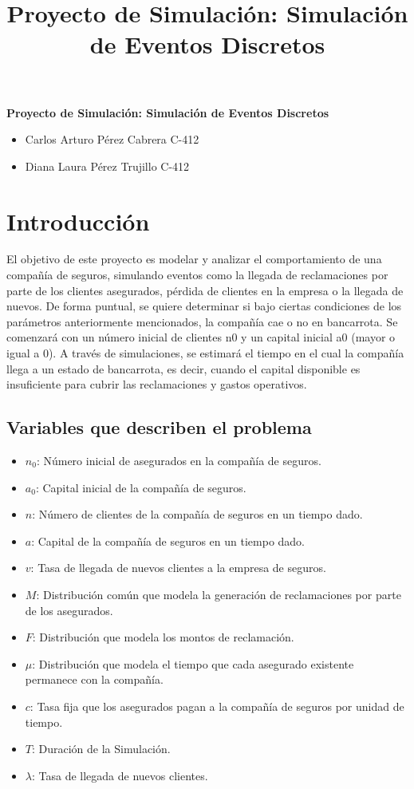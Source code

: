 \documentclass{article}
\title{Proyecto de Simulación: Simulación de Eventos Discretos}
\begin{document}
\begin{titlepage}
    \centering
{\bfseries\Huge Proyecto de Simulación: Simulación de Eventos Discretos \par}
\vspace{2cm}
\begin{itemize}
    \item {\large Carlos Arturo Pérez Cabrera C-412}
    \item {\large Diana Laura Pérez Trujillo C-412}
\end{itemize}

\end{titlepage}

\section{Introducción}

El objetivo de este proyecto es modelar y analizar el comportamiento de una compañía de seguros, simulando eventos como la llegada de reclamaciones por parte de los clientes asegurados, pérdida de clientes en la empresa o la llegada de nuevos. De forma puntual, se quiere determinar si bajo ciertas condiciones de los parámetros anteriormente mencionados, la compañía cae o no en bancarrota. Se comenzará con un número inicial de clientes n0 y un capital inicial a0 (mayor o igual a 0). A través de simulaciones, se estimará el tiempo en el cual la compañía llega a un estado de bancarrota, es decir, cuando el capital disponible es insuficiente para cubrir las reclamaciones y gastos operativos.

\subsection{Variables que describen el problema}
\begin{itemize}
    \item $n_0$: Número inicial de asegurados en la compañía de seguros.
    \item $a_0$: Capital inicial de la compañía de seguros.
    \item $n$: Número de clientes de la compañía de seguros en un tiempo dado.
    \item $a$: Capital de la compañía de seguros en un tiempo dado.
    \item $v$: Tasa de llegada de nuevos clientes a la empresa de seguros.
    \item $M$: Distribución común que modela la generación de reclamaciones por parte de los asegurados.
    \item $F$: Distribución que modela los montos de reclamación.
    \item $\mu$: Distribución que modela el tiempo que cada asegurado existente permanece con la compañía.
    \item $c$: Tasa fija que los asegurados pagan a la compañía de seguros por unidad de tiempo.
    \item $T$: Duración de la Simulación.
    \item $\lambda$: Tasa de llegada de nuevos clientes.
\end{itemize}
\end{document}
